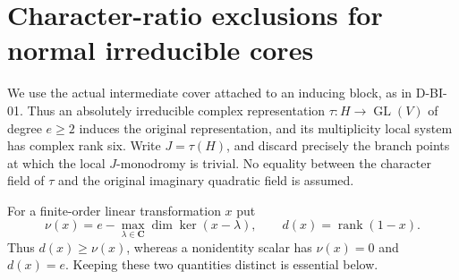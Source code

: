 \section{Character-ratio exclusions for normal irreducible cores}
\label{sec:character-ratio}

We use the actual intermediate cover attached to an inducing block, as in
D-BI-01.  Thus an absolutely irreducible complex representation
$\tau:H\to\operatorname{GL}(V)$ of degree $e\ge2$ induces the original
representation, and its multiplicity local system has complex rank six.
Write $J=\tau(H)$, and discard precisely the branch points at which the
local $J$-monodromy is trivial.  No equality between the character field
of $\tau$ and the original imaginary quadratic field is assumed.

For a finite-order linear transformation $x$ put
\[
 \nu(x)=e-\max_{\lambda\in\mathbf C}\dim\ker(x-\lambda),
 \qquad d(x)=\operatorname{rank}(1-x).
\]
Thus $d(x)\ge\nu(x)$, whereas a nonidentity scalar has $\nu(x)=0$
and $d(x)=e$.  Keeping these two quantities distinct is essential below.

